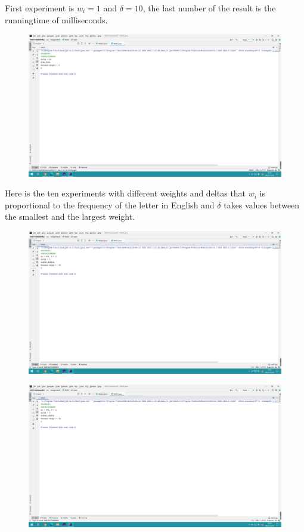 \documentclass[]{article}
\begin{document}
	
	\noindent First experiment is $w_{i} = 1$ and $\delta = 10$, the last number of the result is the runningtime of milliseconds.  \\
	
	\begin{figure}[H]
		\centering
		\includegraphics[width=1\linewidth]{screen/A1-1}
		\caption{}
		\label{fig:a1-1}
	\end{figure}
	
	\noindent Here is the ten experiments with different weights and deltas that $w_{i}$ is proportional to the frequency of the letter in English and $\delta$ takes values between the smallest and the largest weight.
	
	\begin{figure}[H]
		\centering
		\includegraphics[width=1\linewidth]{screen/A1-2}
		\caption{}
		\label{fig:a1-1}
	\end{figure}

	\begin{figure}[H]
		\centering
		\includegraphics[width=1\linewidth]{screen/A1-3}
		\caption{}
		\label{fig:a1-1}
	\end{figure}
	
\end{document}
